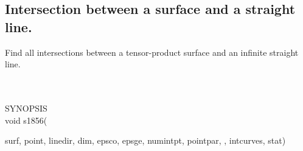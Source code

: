 \subsection{Intersection between a surface and a straight line.}
\begin{minipg1}
  Find all intersections between a tensor-product surface and an infinite straight
  line.
\end{minipg1} \\ \\
SYNOPSIS\\
        \>void s1856(\begin{minipg3}
                {\fov surf}, {\fov point}, {\fov linedir}, {\fov dim}, {\fov epsco}, {\fov epsge}, {\fov numintpt}, {\fov pointpar},
                , {\fov intcurves}, {\fov stat})
                \end{minipg3}\\[0.3ex]

